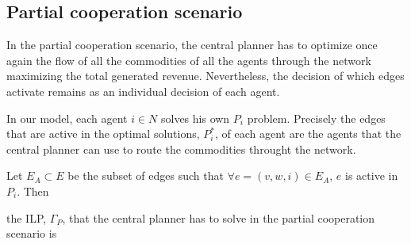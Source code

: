 \documentclass[review]{elsarticle}
\begin{document}
\subsection{Partial cooperation scenario}

In the partial cooperation scenario, the central planner has to optimize once
again the flow of all the commodities of all the agents through the network
maximizing the total generated revenue. Nevertheless, the decision of which
edges activate remains as an individual decision of each agent.

In our model, each agent $i \in N$ solves his own $P_i$ problem. Precisely the edges
that are active in the optimal solutions, $P_i^*$, of each agent are the agents
that the central planner can use to route the commodities throught the network.

Let $E_A \subset E$ be the subset of edges such that $\forall e=(v,w,i) \in
E_A$, $e$ is active in $P_i$. Then 

the ILP, $\Gamma_P$, that the central planner has to solve
in the partial cooperation scenario is
\end{document}
